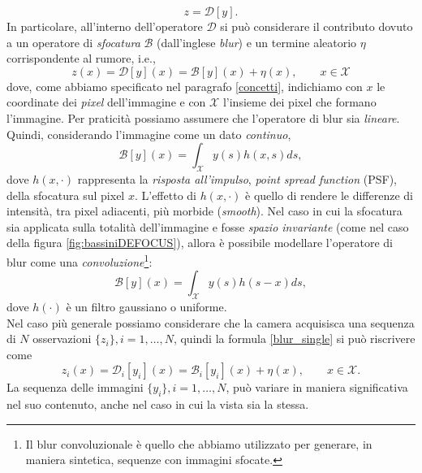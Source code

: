 \begin{equation}
z=\mathcal{D}[y].
\end{equation}
In particolare, all'interno dell'operatore $\mathcal{D}$ si pu\`o considerare il contributo dovuto a un operatore di \textit{sfocatura} $\mathcal{B}$ (dall'inglese \textit{blur}) e un termine aleatorio $\eta$ corrispondente al rumore, i.e.,
\begin{equation}
\label{blur_single}
z(x)=\mathcal{D}[y](x) = \mathcal{B}[y](x) + \eta(x), \qquad x \in \mathcal{X}
\end{equation}
dove, come abbiamo specificato nel paragrafo \ref{concetti}, indichiamo con $x$ le coordinate dei \textit{pixel} dell'immagine e con $\mathcal{X}$ l'insieme dei pixel che formano l'immagine. 
Per praticit\`a possiamo assumere che l'operatore di blur sia \textit{lineare}.
Quindi, considerando l'immagine come un dato \textit{continuo},
\begin{equation}
\label{eq:blur}
\mathcal{B}[y](x) = \int_{\mathcal{X}}y(s)h(x,s)ds,
\end{equation}
dove $h(x,\cdot)$ rappresenta la \textit{risposta all'impulso}, \textit{point spread function} (PSF), della sfocatura sul pixel $x$.
L'effetto di $h(x, \cdot)$ \`e quello di rendere le differenze di intensit\`a, tra pixel adiacenti, pi\`u morbide (\textit{smooth}).
Nel caso in cui la sfocatura sia applicata sulla totalit\`a dell'immagine e fosse \textit{spazio invariante} (come nel caso della figura \ref{fig:bassiniDEFOCUS}), allora \`e possibile modellare l'operatore di blur come una \textit{convoluzione}\footnote{Il blur convoluzionale \`e quello che abbiamo utilizzato per generare, in maniera sintetica, sequenze con immagini sfocate.}:
\begin{equation}
\label{blur_convolution}
\mathcal{B}[y](x) = \int_{\mathcal{X}}y(s)h(s-x)ds,
\end{equation}
dove $h(\cdot)$ \`e un filtro gaussiano o uniforme.\\
Nel caso pi\`u generale possiamo considerare che la camera acquisisca una sequenza di $N$ osservazioni $\{z_i\}, i = 1, \dots ,N$, quindi la formula \eqref{blur_single} si pu\`o riscrivere come
\begin{equation}
\label{blur_multi}
z_i(x)=\mathcal{D}_i[y_i](x) = \mathcal{B}_i[y_i](x) + \eta(x), \qquad x \in \mathcal{X}.
\end{equation}
La sequenza delle immagini $\{y_i\}, i = 1,\dots , N$, pu\`o variare in maniera significativa nel suo contenuto, anche nel caso in cui la vista sia la stessa.
